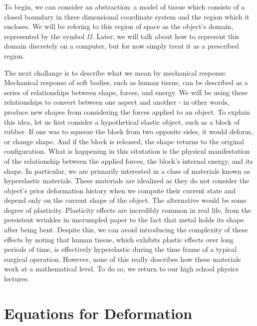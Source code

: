 \documentclass[12pt,oneside,letterpaper]{memoir}
\begin{document}
To begin, we can consider an abstraction: a model of
tissue which consists of a closed boundary in three dimensional
coordinate system and the region which it encloses. We will be
refering to this region of space as the object's domain, represented
by the symbol $\Omega$. Later, we will talk about how to represent
this domain discretely on a computer, but for now simply treat it as a
prescribed region.

The next challange is to describe what we mean by mechanical
response. Mechanical response of soft bodies, such as human tissue,
can be described as a series of relationships between shape, forces,
and energy. We will be using these relationships to convert between
one aspect and another - in other words, produce new shapes from
considering the forces applied to an object. To explain this idea, let
us first consider a hypothetical elastic object, such as a block of
rubber. If one was to squeeze the block from two opposite sides, it
would deform, or change shape. And if the block is released, the shape
returns to the original configuration. What is happening in this
situtation is the physical manifestation of the relationship between
the applied forces, the block's internal energy, and its shape. In
particular, we are primarily interested in a class of materials known
as \gls{hyperelastic} materials. These materials are idealized as they
do not consider the object's prior deformation history when we compute
their current state and depend only on the current shape of the
object. The alternative would be some degree of
\gls{plasticity}. Plasticity effects are incredibly common in real
life, from the persistent wrinkles in uncrumpled paper to the fact
that metal holds its shape after being bent. Despite this, we can
avoid introducing the complexity of these effects by noting that human
tissue, which exhibits plastic effects over long periods of time, is
effectively hyperelastic during the time frame of a typical surgical
operation. However, none of this really describes how these materials
work at a mathematical level. To do so, we return to our high school
physics lectures.

\section{Equations for Deformation}
\end{document}
